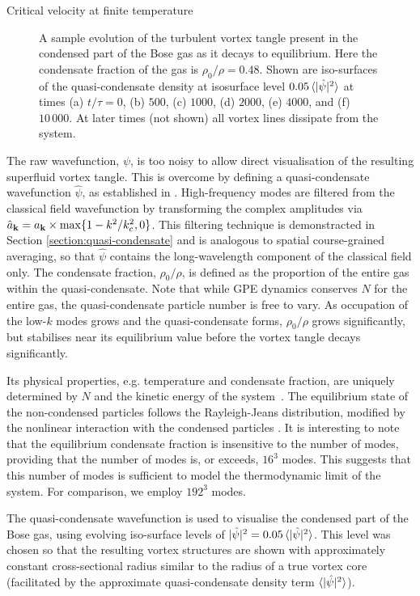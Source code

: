 \begin{chapter}{\label{cha:nonequib}Critical velocity at finite temperature}
\begin{figure}[!ht]
    \caption{A sample evolution of the turbulent vortex tangle present in the condensed part of the Bose gas as it decays to equilibrium. Here the condensate fraction of the gas is $\rho_0/\rho = 0.48$. Shown are iso-surfaces of the quasi-condensate density at isosurface level $0.05\braket{|\hat{\psi}|^2}$ at times (a) $t/\tau=0$, (b) $500$, (c) $1000$, (d) $2000$, (e) $4000$, and (f) $10\,000$. At later times (not shown) all vortex lines dissipate from the system.
}
    \label{fig:thermal}
\end{figure}

The raw wavefunction, $\psi$, is too noisy to allow direct visualisation of the resulting superfluid vortex tangle. This is overcome by defining a quasi-condensate wavefunction $\hat{\psi}$, as established in \cite{PhysRevA.66.013603}. High-frequency modes are filtered from the classical field wavefunction by transforming the complex amplitudes via $\hat{a}_{{\bf k}} = a_{{\bf k}}\times\max\{1-k^{2}/k_c^2,0\}$. This filtering technique is demonstracted in Section \ref{section:quasi-condensate} and is analogous to spatial course-grained averaging, so that $\hat{\psi}$ contains the long-wavelength component of the classical field only.  The condensate fraction, $\rho_0/\rho$, is defined as the proportion of the entire gas within the quasi-condensate. Note that while GPE dynamics conserves $N$ for the entire gas, the quasi-condensate particle number is free to vary. As occupation of the low-$k$ modes grows and the quasi-condensate forms, $\rho_0/\rho$ grows significantly, but stabilises near its equilibrium value before the vortex tangle decays significantly. 

Its physical properties, e.g. temperature and condensate fraction, are uniquely determined by $N$ and the kinetic energy of the system~\cite{PhysRevLett.95.263901}.  The equilibrium state of the non-condensed particles follows the Rayleigh-Jeans distribution, modified by the nonlinear interaction with the condensed particles \cite{PhysRevLett.95.263901}.  It is interesting to note that the equilibrium condensate fraction is insensitive to the number of modes, providing that the number of modes is, or exceeds, $16^3$ modes.  This suggests that this number of modes is sufficient to model the thermodynamic limit of the system. For comparison, we employ $192^3$ modes.

The quasi-condensate wavefunction is used to visualise the condensed part of the Bose gas, using evolving iso-surface levels of $|\hat{\psi}|^2 = 0.05\braket{|\hat{\psi}|^2}$. This level was chosen so that the resulting vortex structures are shown with approximately constant cross-sectional radius similar to the radius of a true vortex core (facilitated by the approximate quasi-condensate density term $\braket{|\hat{\psi}|^2}$).


\end{chapter}
